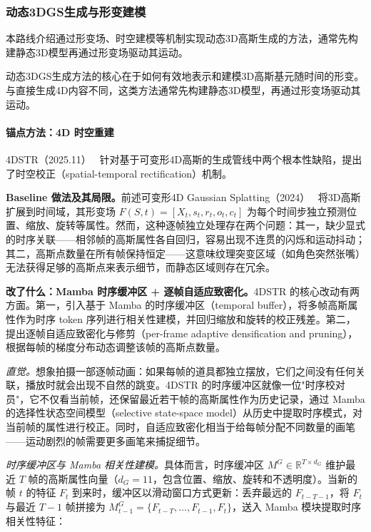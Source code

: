 \subsubsection{动态3DGS生成与形变建模}
\label{sec:08_3_1_2}

本路线介绍通过形变场、时空建模等机制实现动态3D高斯生成的方法，通常先构建静态3D模型再通过形变场驱动其运动。

动态3DGS生成方法的核心在于如何有效地表示和建模3D高斯基元随时间的形变。与直接生成4D内容不同，这类方法通常先构建静态3D模型，再通过形变场驱动其运动。

\paragraph{锚点方法：4D 时空重建}

4DSTR（2025.11）~\cite{2511_07241} 针对基于可变形4D高斯的生成管线中两个根本性缺陷，提出了时空校正（spatial-temporal rectification）机制。

\textbf{Baseline 做法及其局限。}前述可变形4D Gaussian Splatting（2024）~\cite{wu20244d} 将3D高斯扩展到时间域，其形变场 $F(S, t) = [X_t, s_t, r_t, o_t, c_t]$ 为每个时间步独立预测位置、缩放、旋转等属性。然而，这种逐帧独立处理存在两个问题：其一，缺少显式的时序关联——相邻帧的高斯属性各自回归，容易出现不连贯的闪烁和运动抖动；其二，高斯点数量在所有帧保持恒定——这意味纹理突变区域（如角色突然张嘴）无法获得足够的高斯点来表示细节，而静态区域则存在冗余。

\textbf{改了什么：Mamba 时序缓冲区 + 逐帧自适应致密化。}4DSTR 的核心改动有两方面。第一，引入基于 Mamba 的时序缓冲区（temporal buffer），将多帧高斯属性作为时序 token 序列进行相关性建模，并回归缩放和旋转的校正残差。第二，提出逐帧自适应致密化与修剪（per-frame adaptive densification and pruning），根据每帧的梯度分布动态调整该帧的高斯点数量。

\textit{直觉。}想象拍摄一部逐帧动画：如果每帧的道具都独立摆放，它们之间没有任何关联，播放时就会出现不自然的跳变。4DSTR 的时序缓冲区就像一位"时序校对员"，它不仅看当前帧，还保留最近若干帧的高斯属性作为历史记录，通过 Mamba 的选择性状态空间模型（selective state-space model）从历史中提取时序模式，对当前帧的属性进行校正。同时，自适应致密化相当于给每帧分配不同数量的画笔——运动剧烈的帧需要更多画笔来捕捉细节。

\textit{时序缓冲区与 Mamba 相关性建模。}具体而言，时序缓冲区 $M^G \in \mathbb{R}^{T \times d_G}$ 维护最近 $T$ 帧的高斯属性向量（$d_G=11$，包含位置、缩放、旋转和不透明度）。当新的帧 $t$ 的特征 $F_t$ 到来时，缓冲区以滑动窗口方式更新：丢弃最远的 $F_{t-T-1}$，将 $F_t$ 与最近 $T-1$ 帧拼接为 $M^G_{t-1} = \{F_{t-T}, \ldots, F_{t-1}, F_t\}$，送入 Mamba 模块提取时序相关性特征：

